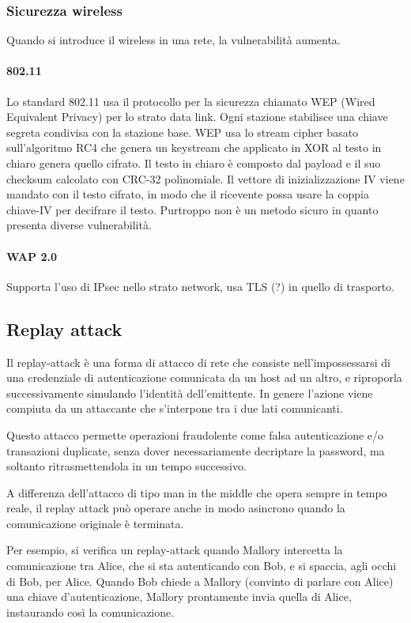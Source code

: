 \subsubsection{Sicurezza wireless} %
Quando si introduce il wireless in una rete, la vulnerabilità aumenta.

\paragraph{802.11}
Lo standard 802.11 usa il protocollo per la sicurezza chiamato WEP (Wired Equivalent Privacy) per lo strato data link.
Ogni stazione stabilisce una chiave segreta condivisa con la stazione base.
WEP usa lo stream cipher basato sull'algoritmo RC4 che genera un keystream che applicato in XOR al testo in chiaro genera quello cifrato.
Il testo in chiaro è composto dal payload e il suo checksum calcolato con CRC-32 polinomiale. 
Il vettore di inizializzazione IV viene mandato con il testo cifrato, in modo che il ricevente possa usare la coppia chiave-IV per decifrare il testo.
Purtroppo non è un metodo sicuro in quanto presenta diverse vulnerabilità.

\paragraph{WAP 2.0}
Supporta l'uso di IPsec nello strato network, usa TLS (?) in quello di trasporto.

\subsection{Replay attack} %
Il replay-attack è una forma di attacco di rete che consiste nell'impossessarsi di una credenziale di autenticazione comunicata da un host ad un altro, e riproporla successivamente simulando l'identità dell'emittente.
In genere l'azione viene compiuta da un attaccante che s'interpone tra i due lati comunicanti.

Questo attacco permette operazioni fraudolente come falsa autenticazione e/o transazioni duplicate, senza dover necessariamente decriptare la password, ma soltanto ritrasmettendola in un tempo successivo.

A differenza dell'attacco di tipo man in the middle che opera sempre in tempo reale, il replay attack può operare anche in modo asincrono quando la comunicazione originale è terminata.

Per esempio, si verifica un replay-attack quando Mallory intercetta la comunicazione tra Alice, che si sta autenticando con Bob, e si spaccia, agli occhi di Bob, per Alice.
Quando Bob chiede a Mallory (convinto di parlare con Alice) una chiave d'autenticazione, Mallory prontamente invia quella di Alice, instaurando così la comunicazione.

